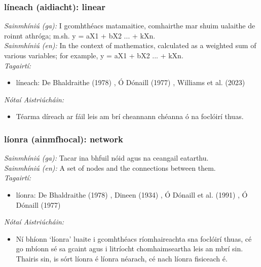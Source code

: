 \documentclass{article}
\begin{document}
\subsubsection*{líneach (aidiacht): linear}
 \noindent \textit{Sainmhíniú (ga):} I gcomhthéacs matamaitice, comhairthe mar shuim ualaithe de roinnt athróga; m.sh. y = aX1 + bX2 ... + kXn.
\\
 \noindent \textit{Sainmhíniú (en):} In the context of mathematics, calculated as a weighted sum of various variables; for example, y = aX1 + bX2 ... + kXn.
\\
 \noindent \textit{Tagairtí:}
\begin{itemize}
	\item líneach: De Bhaldraithe (1978) \cite{de-bhaldraithe}, Ó Dónaill (1977) \cite{odonaill}, Williams et al. (2023) \cite{storchiste}
\end{itemize}

 \noindent \textit{Nótaí Aistriúcháin:}
\begin{itemize}
	\item Téarma díreach ar fáil leis am brí cheannann chéanna ó na foclóirí thuas.
\end{itemize}


\subsubsection*{líonra (ainmfhocal): network}
 \noindent \textit{Sainmhíniú (ga):} Tacar ina bhfuil nóid agus na ceangail eatarthu.
\\
 \noindent \textit{Sainmhíniú (en):} A set of nodes and the connections between them.
\\
 \noindent \textit{Tagairtí:}
\begin{itemize}
	\item líonra: De Bhaldraithe (1978) \cite{de-bhaldraithe}, Dineen (1934) \cite{dineen}, Ó Dónaill et al. (1991) \cite{focloir-beag}, Ó Dónaill (1977) \cite{odonaill}
\end{itemize}

 \noindent \textit{Nótaí Aistriúcháin:}
\begin{itemize}
	\item Ní bhíonn `líonra' luaite i gcomhthéacs ríomhaireachta sna foclóirí thuas, cé go mbíonn sé sa gcaint agus i litríocht chomhaimseartha leis an mbrí sin. Thairis sin, is sórt líonra é líonra néarach, cé nach líonra fisiceach é.
\end{itemize}
\end{document}

